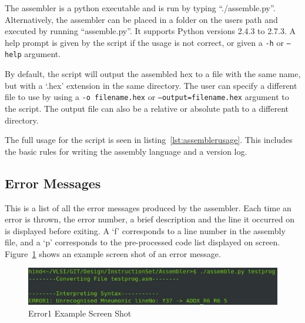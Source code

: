 The assembler is a python executable and is run by typing ``./assemble.py''. 
Alternatively, the assembler can be placed in a folder on the users path and executed by running ``assemble.py''.
It supports Python versions 2.4.3 to 2.7.3.
A help prompt is given by the script if the usage is not correct, or given a \texttt{-h} or \texttt{--help} argument. 

By default, the script will output the assembled hex to a file with the same name, but with a `.hex' extension in the same directory.
The user can specify a different file to use by using a \texttt{-o filename.hex} or \texttt{--output=filename.hex} argument to the script.
The output file can also be a relative or absolute path to a different directory. 

The full usage for the script is seen in listing~\ref{lst:assemblerusage}. 
This includes the basic rules for writing the assembly language and a version log. 

%

\subsection{Error Messages}
This is a list of all the error messages produced by the assembler. 
Each time an error is thrown, the error number, a brief description and the line it occurred on is displayed before exiting. 
A `f' corresponds to a line number in the assembly file, and a `p' corresponds to the pre-processed code list displayed on screen. 
Figure~\ref{fig:AssErrorEx} shows an example screen shot of an error message.



\begin{figure}[h]
	\includegraphics{Figures/error1screenshot.jpg}
	\caption{Error1 Example Screen Shot}
	\label{fig:AssErrorEx}
\end{figure}

